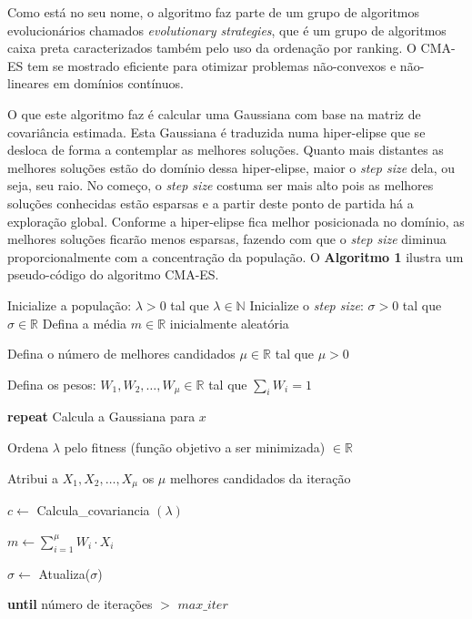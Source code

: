 Como está no seu nome, o algoritmo faz parte de um grupo de algoritmos evolucionários chamados \emph{evolutionary strategies}, que é um grupo de algoritmos caixa preta caracterizados também pelo uso da ordenação por ranking. O CMA-ES tem se mostrado eficiente para otimizar problemas não-convexos e não-lineares em domínios contínuos.

O que este algoritmo faz é calcular uma Gaussiana com base na matriz de covariância estimada. Esta Gaussiana é traduzida numa hiper-elipse que se desloca de forma a contemplar as melhores soluções. Quanto mais distantes as melhores soluções estão do domínio dessa hiper-elipse, maior o \emph{step size} dela, ou seja, seu raio. No começo, o \emph{step size} costuma ser mais alto pois as melhores soluções conhecidas estão esparsas e a partir deste ponto de partida há a exploração global. Conforme a hiper-elipse fica melhor posicionada no domínio, as melhores soluções ficarão menos esparsas, fazendo com que o \emph{step size} diminua proporcionalmente com a concentração da população. O \textbf{Algoritmo 1} ilustra um pseudo-código do algoritmo CMA-ES.

\begin{algorithm}
\caption{CMA-ES}
\begin{algorithmic}[1]

\State Inicialize a população: $\lambda > 0$ tal que $\lambda \in \mathbb{N}$
\State Inicialize o \textit{step size}: $\sigma > 0$ tal que $\sigma \in \mathbb{R}$
\State Defina a média $m \in \mathbb{R}$ inicialmente aleatória

\State Defina o número de melhores candidados $\mu \in \mathbb{R}$ tal que $\mu > 0$

\State Defina os pesos: $W_1, W_2, \ldots, W_\mu \in \mathbb{R}$ tal que $\sum_{i} W_i = 1$

\State \textbf{repeat}
  \State Calcula a Gaussiana para $x$
\EndFor

	\State Ordena $\lambda$ pelo fitness (função objetivo a ser minimizada) $\in \mathbb{R}$

\State Atribui a $X_1, X_2, \ldots, X_\mu$ os $\mu$ melhores candidados da iteração

\State $c \gets$ Calcula\_covariancia $(\lambda)$

\State $m \gets \sum_{i=1}^{\mu} W_i \cdot X_i$

\State $\sigma \gets$ Atualiza($\sigma$)

\State \textbf{until} número de iterações $>$ $max\_iter$

\end{algorithmic}
\end{algorithm}

